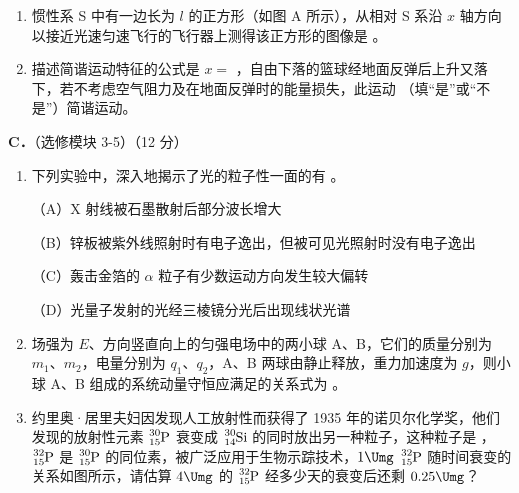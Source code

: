 \documentclass[\gkver]{gaokaozhenti}
\begin{document}
\begin{enumerate}
\begin{enumerate}
	
	\item
	惯性系 S 中有一边长为 $l$ 的正方形（如图 A 所示），从相对 S 系沿 $x$ 轴方向以接近光速匀速飞行的飞行器上测得该正方形的图像是 \tkanswer[1.5cm]{}。
	
	
	\item
	描述简谐运动特征的公式是 $x=$ \tkanswer[2.5cm]{}，自由下落的篮球经地面反弹后上升又落下，若不考虑空气阻力及在地面反弹时的能量损失，此运动 \tkanswer[1.5cm]{}（填“是”或“不是”）简谐运动。
\end{enumerate}

\textbf{C．}（选修模块 3-5）（12 分）

\begin{enumerate}
	\item
	下列实验中，深入地揭示了光的粒子性一面的有 \tkanswer[2cm]{}。
	
	（A）X 射线被石墨散射后部分波长增大
	
	（B）锌板被紫外线照射时有电子逸出，但被可见光照射时没有电子逸出
	
	（C）轰击金箔的 $\alpha$ 粒子有少数运动方向发生较大偏转
	
	（D）光量子发射的光经三棱镜分光后出现线状光谱
	
	
	\item
	场强为 $E$、方向竖直向上的匀强电场中的两小球 A、B，它们的质量分别为 $m_{1}$、$m_{2}$，电量分别为 $q_{1}$、$q_{2}$，A、B 两球由静止释放，重力加速度为 $g$，则小球 A、B 组成的系统动量守恒应满足的关系式为 \tkanswer[5cm]{}。
	
	\item
	约里奥·居里夫妇因发现人工放射性而获得了 1935 年的诺贝尔化学奖，他们发现的放射性元素 $\ce{^{30}_{15}P}$ 衰变成 $\ce{^{30}_{14}Si}$ 的同时放出另一种粒子，这种粒子是 \tkanswer[2cm]{}，$\ce{^{32}_{15}P}$ 是 $\ce{^{30}_{15}P}$ 的同位素，被广泛应用于生物示踪技术，$1\Umg$ $\ce{^{32}_{15}P}$ 随时间衰变的关系如图所示，请估算 $4\Umg$ 的 $\ce{^{32}_{15}P}$ 经多少天的衰变后还剩 $0.25\Umg$？
	
\end{enumerate}

\end{enumerate}
\end{document}
